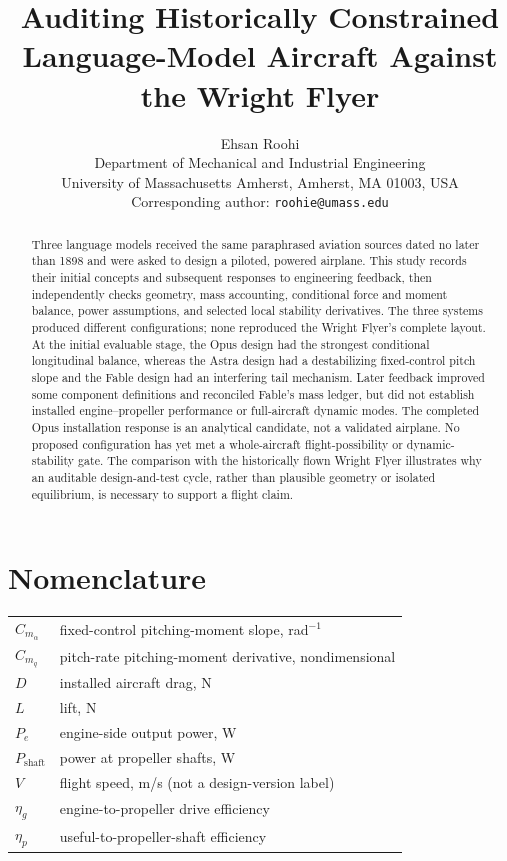 \documentclass[10pt,letterpaper]{article}
\title{Auditing Historically Constrained Language-Model Aircraft Against the Wright Flyer}
\author{Ehsan Roohi\\
\small Department of Mechanical and Industrial Engineering\\
\small University of Massachusetts Amherst, Amherst, MA 01003, USA\\
\small Corresponding author: \texttt{roohie@umass.edu}}
\date{}
\begin{document}
\maketitle

\begin{abstract}
Three language models received the same paraphrased aviation sources dated no later than 1898 and were asked to design a piloted, powered airplane. This study records their initial concepts and subsequent responses to engineering feedback, then independently checks geometry, mass accounting, conditional force and moment balance, power assumptions, and selected local stability derivatives. The three systems produced different configurations; none reproduced the Wright Flyer's complete layout. At the initial evaluable stage, the Opus design had the strongest conditional longitudinal balance, whereas the Astra design had a destabilizing fixed-control pitch slope and the Fable design had an interfering tail mechanism. Later feedback improved some component definitions and reconciled Fable's mass ledger, but did not establish installed engine--propeller performance or full-aircraft dynamic modes. The completed Opus installation response is an analytical candidate, not a validated airplane. No proposed configuration has yet met a whole-aircraft flight-possibility or dynamic-stability gate. The comparison with the historically flown Wright Flyer illustrates why an auditable design-and-test cycle, rather than plausible geometry or isolated equilibrium, is necessary to support a flight claim.
\end{abstract}

\section*{Nomenclature}
\noindent\begin{tabular}{@{}ll@{}}
$C_{m_\alpha}$ & fixed-control pitching-moment slope, rad$^{-1}$\\
$C_{m_q}$ & pitch-rate pitching-moment derivative, nondimensional\\
$D$ & installed aircraft drag, N\\
$L$ & lift, N\\
$P_e$ & engine-side output power, W\\
$P_{\mathrm{shaft}}$ & power at propeller shafts, W\\
$V$ & flight speed, m/s (not a design-version label)\\
$\eta_g$ & engine-to-propeller drive efficiency\\
$\eta_p$ & useful-to-propeller-shaft efficiency\\
\end{tabular}
\end{document}
